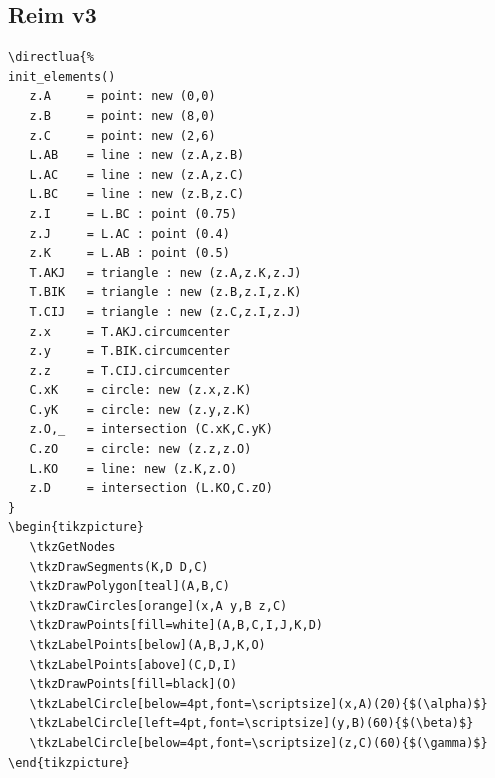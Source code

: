 
\subsection{Reim v3} %
\label{sub:reim_v3}

\begin{minipage}{.5\textwidth}
\begin{Verbatim}
\directlua{%
init_elements()
   z.A     = point: new (0,0)
   z.B     = point: new (8,0)
   z.C     = point: new (2,6)
   L.AB    = line : new (z.A,z.B)
   L.AC    = line : new (z.A,z.C)
   L.BC    = line : new (z.B,z.C)
   z.I     = L.BC : point (0.75)
   z.J     = L.AC : point (0.4)
   z.K     = L.AB : point (0.5)
   T.AKJ   = triangle : new (z.A,z.K,z.J)
   T.BIK   = triangle : new (z.B,z.I,z.K)
   T.CIJ   = triangle : new (z.C,z.I,z.J)
   z.x     = T.AKJ.circumcenter
   z.y     = T.BIK.circumcenter
   z.z     = T.CIJ.circumcenter
   C.xK    = circle: new (z.x,z.K)
   C.yK    = circle: new (z.y,z.K)
   z.O,_   = intersection (C.xK,C.yK)
   C.zO    = circle: new (z.z,z.O)
   L.KO    = line: new (z.K,z.O)
   z.D     = intersection (L.KO,C.zO)
}
\begin{tikzpicture}
   \tkzGetNodes
   \tkzDrawSegments(K,D D,C)
   \tkzDrawPolygon[teal](A,B,C)
   \tkzDrawCircles[orange](x,A y,B z,C)
   \tkzDrawPoints[fill=white](A,B,C,I,J,K,D)
   \tkzLabelPoints[below](A,B,J,K,O)
   \tkzLabelPoints[above](C,D,I)
   \tkzDrawPoints[fill=black](O)
   \tkzLabelCircle[below=4pt,font=\scriptsize](x,A)(20){$(\alpha)$}
   \tkzLabelCircle[left=4pt,font=\scriptsize](y,B)(60){$(\beta)$}
   \tkzLabelCircle[below=4pt,font=\scriptsize](z,C)(60){$(\gamma)$}
\end{tikzpicture}
\end{Verbatim}
\end{minipage}
